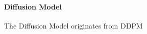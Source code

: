 \paragraph{Diffusion Model}

The Diffusion Model originates from DDPM \cite{hoDenoisingDiffusionProbabilistic2020}